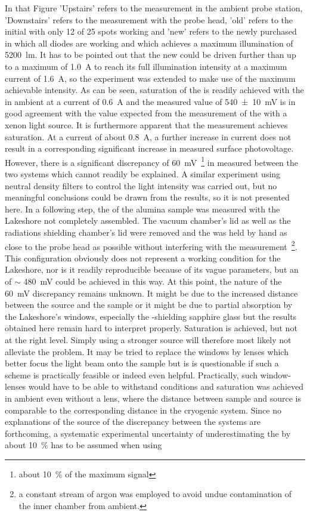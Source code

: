 In that Figure 'Upstairs' refers to the measurement in the ambient probe station, 'Downstairs' refers to the measurement with the \McA{} probe head, 'old' refers to the initial \led{} with only 12 of 25 spots working and 'new' refers to the newly purchased \led{} in which all diodes are working and which achieves a maximum illumination of \SI{5200}{\lumen}. It has to be pointed out that the new \led{} could be driven further than up to a maximum of \SI{1.0}{\ampere} to reach its full illumination intensity at a maximum current of \SI{1.6}{\ampere}, so the experiment was extended to make use of the maximum achievable intensity. As can be seen, saturation of the \spv{} is readily achieved with the \led{} in ambient at a current of \SI{0.6}{\ampere} and the measured value of \SI{540+-10}{\milli\volt} is in good agreement with the value expected from the measurement of the \spv{} with a xenon light source. It is furthermore apparent that the measurement achieves saturation. At a current of about \SI{0.8}{\ampere}, a further increase in current does not result in a corresponding significant increase in measured surface photovoltage. However, there is a significant discrepancy of \SI{60}{\milli\volt}~\footnote{about \SI{10}{\percent} of the maximum signal} in measured \spv{} between the two systems which cannot readily be explained. A similar experiment using neutral density filters to control the light intensity was carried out, but no meaningful conclusions could be drawn from the results, so it is not presented here. In a following step, the \spv{} of the alumina sample was measured with the Lakeshore not completely assembled. The vacuum chamber's lid as well as the radiations shielding chamber's lid were removed and the \led{} was held by hand as close to the probe head as possible without interfering with the measurement~\footnote{a constant stream of argon was employed to avoid undue contamination of the inner chamber from ambient.}. This configuration obviously does not represent a working condition for the Lakeshore, nor is it readily reproducible because of its vague parameters, but an \spv{} of $\sim$ \SI{480}{\milli\volt} could be achieved in this way. At this point, the nature of the \SI{60}{\milli\volt} discrepancy remains unknown. It might be due to the increased distance between the source and the sample or it might be due to partial absorption by the Lakeshore's windows, especially the \ir{}-shielding sapphire glass but the results obtained here remain hard to interpret properly. Saturation is achieved, but not at the right level. Simply using a stronger source will therefore most likely not alleviate the problem. It may be tried to replace the windows by lenses which better focus the light beam onto the sample but is is questionable if such a scheme is practically feasible or indeed even helpful. Practically, such window-lenses would have to be able to withstand \uhv{} conditions and saturation was achieved in ambient even without a lens, where the distance between sample and source is comparable to the corresponding distance in the cryogenic system. Since no explanations of the source of the discrepancy between the systems are forthcoming, a systematic experimental uncertainty of underestimating the \spv{} by about \SI{10}{\percent} has to be assumed when using 